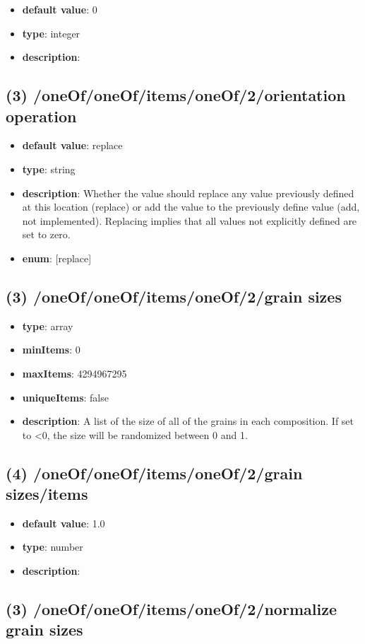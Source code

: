 \begin{itemize}[leftmargin=4em]\item {\bf default value}: 0
\item {\bf type}: integer
\item {\bf description}: 
\end{itemize}\subsection{(3) /oneOf/oneOf/items/oneOf/2/orientation operation}
\begin{itemize}[leftmargin=3em]\item {\bf default value}: replace
\item {\bf type}: string
\item {\bf description}: Whether the value should replace any value previously defined at this location (replace) or add the value to the previously define value (add, not implemented). Replacing implies that all values not explicitly defined are set to zero.
\item {\bf enum}: [replace]\end{itemize}\subsection{(3) /oneOf/oneOf/items/oneOf/2/grain sizes}
\begin{itemize}[leftmargin=3em]\item {\bf type}: array
\item {\bf minItems}: 0
\item {\bf maxItems}: 4294967295
\item {\bf uniqueItems}: false
\item {\bf description}: A list of the size of all of the grains in each composition. If set to <0, the size will be randomized between 0 and 1.
\end{itemize}\subsection{(4) /oneOf/oneOf/items/oneOf/2/grain sizes/items}
\begin{itemize}[leftmargin=4em]\item {\bf default value}: 1.0
\item {\bf type}: number
\item {\bf description}: 
\end{itemize}\subsection{(3) /oneOf/oneOf/items/oneOf/2/normalize grain sizes}
